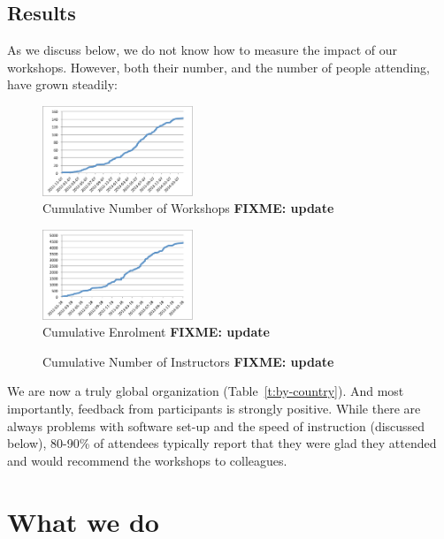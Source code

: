 \documentclass[10pt,a4paper,twocolumn]{article}
\newcommand{\fixme}[1]{\bf{FIXME: {#1}}}
\begin{document}
\subsection*{Results}

As we discuss below, we do not know how to measure the impact of our
workshops.  However, both their number, and the number of people
attending, have grown steadily:

\begin{figure}
\centering
\includegraphics[width=0.4\textwidth]{workshops.pdf}
\caption{Cumulative Number of Workshops \fixme{update}}
\label{f:workshops}
\end{figure}

\begin{figure}
\centering
\includegraphics[width=0.4\textwidth]{enrolment.pdf}
\caption{Cumulative Enrolment \fixme{update}}
\label{f:enrolment}
\end{figure}

\begin{figure}
\centering
\caption{Cumulative Number of Instructors \fixme{update}}
\label{f:instructors}
\end{figure}

We are now a truly global organization (Table~\ref{t:by-country}).
And most importantly, feedback from participants is strongly positive.
While there are always problems with software set-up and the speed of
instruction (discussed below), 80-90\% of attendees typically report
that they were glad they attended and would recommend the workshops to
colleagues.

\section*{What we do}
\end{document}
